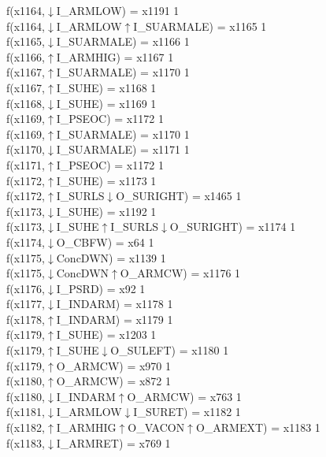 f(x1164,$\downarrow$I\_ARMLOW) = x1191 {1} \\
f(x1164,$\downarrow$I\_ARMLOW$\uparrow$I\_SUARMALE) = x1165 {1} \\
f(x1165,$\downarrow$I\_SUARMALE) = x1166 {1} \\
f(x1166,$\uparrow$I\_ARMHIG) = x1167 {1} \\
f(x1167,$\uparrow$I\_SUARMALE) = x1170 {1} \\
f(x1167,$\uparrow$I\_SUHE) = x1168 {1} \\
f(x1168,$\downarrow$I\_SUHE) = x1169 {1} \\
f(x1169,$\uparrow$I\_PSEOC) = x1172 {1} \\
f(x1169,$\uparrow$I\_SUARMALE) = x1170 {1} \\
f(x1170,$\downarrow$I\_SUARMALE) = x1171 {1} \\
f(x1171,$\uparrow$I\_PSEOC) = x1172 {1} \\
f(x1172,$\uparrow$I\_SUHE) = x1173 {1} \\
f(x1172,$\uparrow$I\_SURLS$\downarrow$O\_SURIGHT) = x1465 {1} \\
f(x1173,$\downarrow$I\_SUHE) = x1192 {1} \\
f(x1173,$\downarrow$I\_SUHE$\uparrow$I\_SURLS$\downarrow$O\_SURIGHT) = x1174 {1} \\
f(x1174,$\downarrow$O\_CBFW) = x64 {1} \\
f(x1175,$\downarrow$ConcDWN) = x1139 {1} \\
f(x1175,$\downarrow$ConcDWN$\uparrow$O\_ARMCW) = x1176 {1} \\
f(x1176,$\downarrow$I\_PSRD) = x92 {1} \\
f(x1177,$\downarrow$I\_INDARM) = x1178 {1} \\
f(x1178,$\uparrow$I\_INDARM) = x1179 {1} \\
f(x1179,$\uparrow$I\_SUHE) = x1203 {1} \\
f(x1179,$\uparrow$I\_SUHE$\downarrow$O\_SULEFT) = x1180 {1} \\
f(x1179,$\uparrow$O\_ARMCW) = x970 {1} \\
f(x1180,$\uparrow$O\_ARMCW) = x872 {1} \\
f(x1180,$\downarrow$I\_INDARM$\uparrow$O\_ARMCW) = x763 {1} \\
f(x1181,$\downarrow$I\_ARMLOW$\downarrow$I\_SURET) = x1182 {1} \\
f(x1182,$\uparrow$I\_ARMHIG$\uparrow$O\_VACON$\uparrow$O\_ARMEXT) = x1183 {1} \\
f(x1183,$\downarrow$I\_ARMRET) = x769 {1} \\
